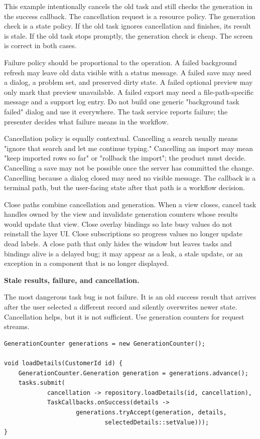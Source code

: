 This example intentionally cancels the old task and still checks the generation
in the success callback. The cancellation request is a resource policy. The
generation check is a state policy. If the old task ignores cancellation and
finishes, its result is stale. If the old task stops promptly, the generation
check is cheap. The screen is correct in both cases.

Failure policy should be proportional to the operation. A failed background
refresh may leave old data visible with a status message. A failed save may
need a dialog, a problem set, and preserved dirty state. A failed optional
preview may only mark that preview unavailable. A failed export may need a
file-path-specific message and a support log entry. Do not build one generic
"background task failed" dialog and use it everywhere. The task service reports
failure; the presenter decides what failure means in the workflow.

Cancellation policy is equally contextual. Cancelling a search usually means
"ignore that search and let me continue typing." Cancelling an import may mean
"keep imported rows so far" or "rollback the import"; the product must decide.
Cancelling a save may not be possible once the server has committed the change.
Cancelling because a dialog closed may need no visible message. The
 callback is a terminal path, but the user-facing state after
that path is a workflow decision.

Close paths combine cancellation and generation. When a view closes, cancel
task handles owned by the view and invalidate generation counters whose results
would update that view. Close overlay bindings so late busy values do not
reinstall the layer UI. Close subscriptions so progress values no longer update
dead labels. A close path that only hides the window but leaves tasks and
bindings alive is a delayed bug; it may appear as a leak, a stale update, or an
exception in a component that is no longer displayed.

\textbf{Stale results, failure, and cancellation.}

The most dangerous task bug is not failure. It is an old success result that
arrives after the user selected a different record and silently overwrites newer
state. Cancellation helps, but it is not sufficient. Use generation counters for
request streams.

\begin{lstlisting}[caption={Generation-gated detail loading.}]
GenerationCounter generations = new GenerationCounter();

void loadDetails(CustomerId id) {
    GenerationCounter.Generation generation = generations.advance();
    tasks.submit(
            cancellation -> repository.loadDetails(id, cancellation),
            TaskCallbacks.onSuccess(details ->
                    generations.tryAccept(generation, details,
                            selectedDetails::setValue)));
}
\end{lstlisting}

